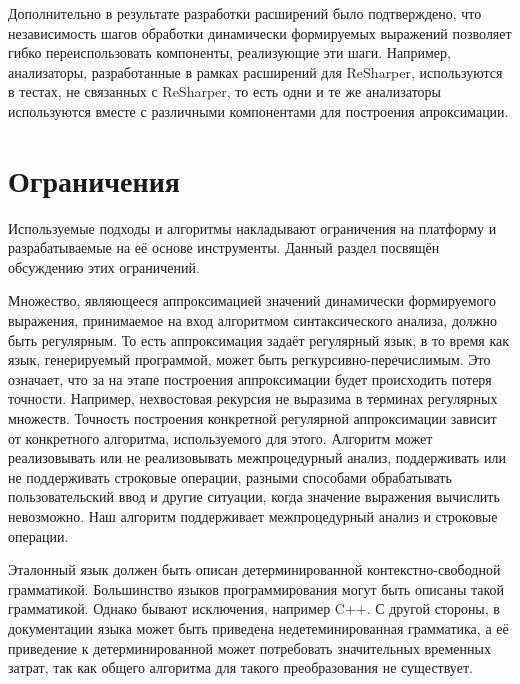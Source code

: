 Дополнительно в результате разработки расширений было подтверждено, что независимость шагов обработки динамически формируемых выражений позволяет гибко переиспользовать компоненты, реализующие эти шаги. Например, анализаторы, разработанные в рамках расширений для ReSharper, используются в тестах, не связанных с ReSharper, то есть одни и те же анализаторы используются вместе с различными компонентами для построения апроксимации.

\section{Ограничения}

Используемые подходы и алгоритмы накладывают ограничения на платформу и разрабатываемые на её основе инструменты. Данный раздел посвящён обсуждению этих ограничений.

Множество, являющееся аппроксимацией значений динамически формируемого выражения, принимаемое на вход алгоритмом синтаксического анализа, должно быть регулярным. То есть аппроксимация задаёт регулярный язык, в то время как язык, генерируемый программой, может быть регкурсивно-перечислимым. Это означает, что за на этапе построения аппроксимации будет происходить потеря точности. Например, нехвостовая рекурсия не выразима в терминах регулярных множеств. Точность построения конкретной регулярной аппроксимации зависит от конкретного алгоритма, используемого для этого. Алгоритм может реализовывать или не реализовывать межпроцедурный анализ, поддерживать или не поддерживать строковые операции, разными способами обрабатывать пользовательский ввод и другие ситуации, когда значение выражения вычислить невозможно. Наш алгоритм поддерживает межпроцедурный анализ и строковые операции. 

Эталонный язык должен быть описан детерминированной контекстно-свободной грамматикой. Большинство языков программирования могут быть описаны такой грамматикой. Однако бывают исключения, например C++. С другой стороны, в документации языка может быть приведена недетеминированная грамматика, а её приведение к детерминированной может потребовать значительных временных затрат, так как общего алгоритма для такого преобразования не существует. 

